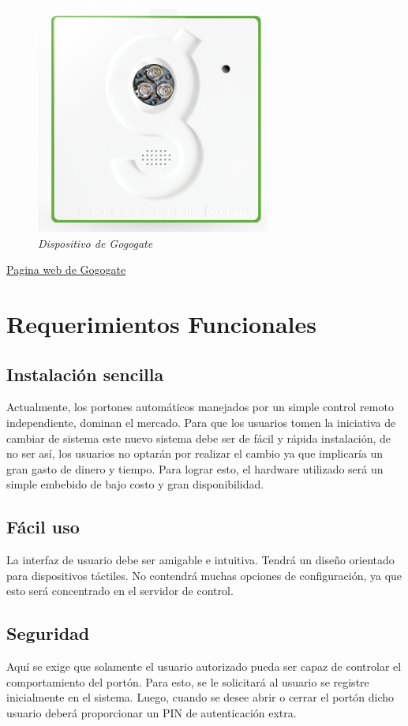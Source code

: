 \documentclass[16pt, article,notitlepage]{article}
\begin{document}
\begin{figure}[H] 
	\centering
	\includegraphics[scale=0.6]{./images/gogogate_disp.png}
	\caption{\textit{ Dispositivo de Gogogate}}
\end{figure}



\href{https://www.gogogate.com/index.html}{Pagina web de Gogogate}

\section{Requerimientos Funcionales}

\subsection{Instalación sencilla}
Actualmente, los portones automáticos manejados por un simple control remoto independiente, dominan el mercado. Para que los usuarios tomen la iniciativa de cambiar de sistema este nuevo sistema debe ser de fácil y rápida instalación, de no ser así, los usuarios no optarán por realizar el cambio ya que implicaría un gran gasto de dinero y tiempo.
Para lograr esto, el hardware utilizado será un simple embebido de bajo costo y gran disponibilidad. 
\subsection{Fácil uso}
La interfaz de usuario debe ser amigable e intuitiva. Tendrá un diseño orientado para dispositivos táctiles. No contendrá muchas opciones de configuración, ya que esto será concentrado en el servidor de control.
\subsection{Seguridad}
Aquí se exige que solamente el usuario autorizado pueda ser capaz de controlar el comportamiento del portón. Para esto, se le solicitará al usuario se registre inicialmente en el sistema. Luego, cuando se desee abrir o cerrar el portón dicho usuario deberá proporcionar un PIN de autenticación extra.
\end{document}
